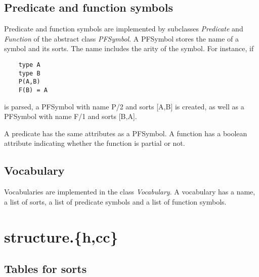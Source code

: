 \documentclass{article}
\begin{document}
\subsection*{Predicate and function symbols}

Predicate and function symbols are implemented by subclasses \emph{Predicate} and \emph{Function} of the abstract class \emph{PFSymbol}. A PFSymbol stores the name of a symbol and its sorts. The name includes the arity of the symbol. For instance, if
\begin{lstlisting}
	type A
	type B
	P(A,B)
	F(B) = A
\end{lstlisting}
is parsed, a PFSymbol with name P/2 and sorts [A,B] is created, as well as a PFSymbol with name F/1 and sorts [B,A].

A predicate has the same attributes as a PFSymbol. A function has a boolean attribute indicating whether the function is partial or not.

\subsection*{Vocabulary}

Vocabularies are implemented in the class \emph{Vocabulary}. A vocabulary has a name, a list of sorts, a list of predicate symbols and a list of function symbols.

\section{structure.\{h,cc\}}

\subsection*{Tables for sorts}
\end{document}
